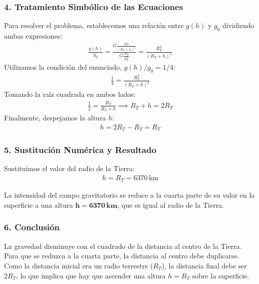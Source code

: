 \subsubsection*{4. Tratamiento Simbólico de las Ecuaciones}
Para resolver el problema, establecemos una relación entre $g(h)$ y $g_0$ dividiendo ambas expresiones:
\begin{gather}
    \frac{g(h)}{g_0} = \frac{G \frac{M_T}{(R_T + h)^2}}{G \frac{M_T}{R_T^2}} = \frac{R_T^2}{(R_T + h)^2}
\end{gather}
Utilizamos la condición del enunciado, $g(h)/g_0 = 1/4$:
\begin{gather}
    \frac{1}{4} = \frac{R_T^2}{(R_T + h)^2}
\end{gather}
Tomando la raíz cuadrada en ambos lados:
\begin{gather}
    \frac{1}{2} = \frac{R_T}{R_T + h} \implies R_T + h = 2R_T
\end{gather}
Finalmente, despejamos la altura $h$:
\begin{gather}
    h = 2R_T - R_T = R_T
\end{gather}

\subsubsection*{5. Sustitución Numérica y Resultado}
Sustituimos el valor del radio de la Tierra:
\begin{gather}
    h = R_T = 6370\,\text{km}
\end{gather}
\begin{cajaresultado}
La intensidad del campo gravitatorio se reduce a la cuarta parte de su valor en la superficie a una altura $\boldsymbol{h = 6370\,\textbf{km}}$, que es igual al radio de la Tierra.
\end{cajaresultado}

\subsubsection*{6. Conclusión}
\begin{cajaconclusion}
La gravedad disminuye con el cuadrado de la distancia al centro de la Tierra. Para que se reduzca a la cuarta parte, la distancia al centro debe duplicarse. Como la distancia inicial era un radio terrestre ($R_T$), la distancia final debe ser $2R_T$, lo que implica que hay que ascender una altura $h=R_T$ sobre la superficie.
\end{cajaconclusion}

\newpage
